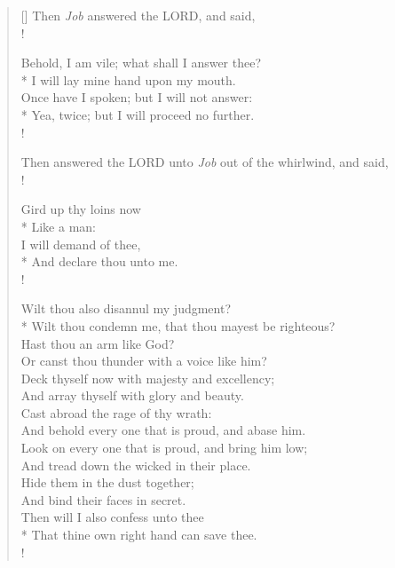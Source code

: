 \documentclass[MAIN]{subfiles}
\begin{document}
\begin{verse}[\versewidth]
Then \emph{Job} answered the {\hge LORD}, and said,\\!

Behold, I am vile; what shall I answer thee?\\*
\vin I will lay mine hand upon my mouth.\\
Once have I spoken; but I will not answer:\\*
\vin Yea, twice; but I will proceed no further.\\!

Then answered the {\hge LORD} unto \emph{Job} out of the whirlwind, and said,\\!

Gird up thy loins now\\*
\vin Like a man:\\
I will demand of thee,\\*
\vin And declare thou unto me.\\!

Wilt thou also disannul my judgment?\\*
\vin Wilt thou condemn me, that thou mayest be righteous?\\
Hast thou an arm like God?\\
\vin Or canst thou thunder with a voice like him?\\
Deck thyself now with majesty and excellency;\\
\vin And array thyself with glory and beauty.\\
Cast abroad the rage of thy wrath:\\
\vin And behold every one that is proud, and abase him.\\
Look on every one that is proud, and bring him low;\\
\vin And tread down the wicked in their place.\\
Hide them in the dust together;\\
\vin And bind their faces in secret.\\
Then will I also confess unto thee\\*
\vin That thine own right hand can save thee.\\!


\end{verse}
\end{document}
